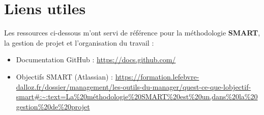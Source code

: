 \section{Liens utiles}
Les ressources ci-dessous m’ont servi de référence pour la méthodologie \textbf{SMART}, la gestion de projet et l’organisation du travail :
\newline

\begin{itemize}
    \item Documentation GitHub : \url{https://docs.github.com/}
    \item Objectifs SMART (Atlassian) : \url{https://formation.lefebvre-dalloz.fr/dossier/management/les-outils-du-manager/quest-ce-que-lobjectif-smart#:~:text=La%20méthodologie%20SMART%20est%20un,dans%20la%20gestion%20de%20projet}
\end{itemize}